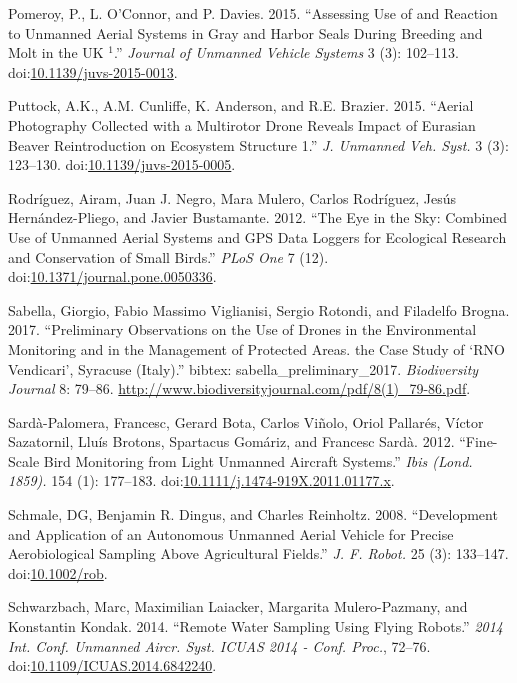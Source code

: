 \documentclass[]{interact}
\theoremstyle{plain}%
\theoremstyle{definition}
\theoremstyle{remark}
\begin{document}
\hypertarget{ref-pomeroy_assessing_2015}{}
Pomeroy, P., L. O'Connor, and P. Davies. 2015. ``Assessing Use of and
Reaction to Unmanned Aerial Systems in Gray and Harbor Seals During
Breeding and Molt in the UK \(^{\textrm{1}}\).'' \emph{Journal of
Unmanned Vehicle Systems} 3 (3): 102--113.
doi:\href{https://doi.org/10.1139/juvs-2015-0013}{10.1139/juvs-2015-0013}.

\hypertarget{ref-puttock_aerial_2015}{}
Puttock, A.K., A.M. Cunliffe, K. Anderson, and R.E. Brazier. 2015.
``Aerial Photography Collected with a Multirotor Drone Reveals Impact of
Eurasian Beaver Reintroduction on Ecosystem Structure 1.'' \emph{J.
Unmanned Veh. Syst.} 3 (3): 123--130.
doi:\href{https://doi.org/10.1139/juvs-2015-0005}{10.1139/juvs-2015-0005}.

\hypertarget{ref-rodriguez_eye_2012}{}
Rodríguez, Airam, Juan J. Negro, Mara Mulero, Carlos Rodríguez, Jesús
Hernández-Pliego, and Javier Bustamante. 2012. ``The Eye in the Sky:
Combined Use of Unmanned Aerial Systems and GPS Data Loggers for
Ecological Research and Conservation of Small Birds.'' \emph{PLoS One} 7
(12).
doi:\href{https://doi.org/10.1371/journal.pone.0050336}{10.1371/journal.pone.0050336}.

\hypertarget{ref-sabella_preliminary_2017}{}
Sabella, Giorgio, Fabio Massimo Viglianisi, Sergio Rotondi, and
Filadelfo Brogna. 2017. ``Preliminary Observations on the Use of Drones
in the Environmental Monitoring and in the Management of Protected
Areas. the Case Study of `RNO Vendicari', Syracuse (Italy).'' bibtex:
sabella\_preliminary\_2017. \emph{Biodiversity Journal} 8: 79--86.
\url{http://www.biodiversityjournal.com/pdf/8(1)_79-86.pdf}.

\hypertarget{ref-sarda-palomera_fine-scale_2012}{}
Sardà-Palomera, Francesc, Gerard Bota, Carlos Viñolo, Oriol Pallarés,
Víctor Sazatornil, Lluís Brotons, Spartacus Gomáriz, and Francesc Sardà.
2012. ``Fine-Scale Bird Monitoring from Light Unmanned Aircraft
Systems.'' \emph{Ibis (Lond. 1859).} 154 (1): 177--183.
doi:\href{https://doi.org/10.1111/j.1474-919X.2011.01177.x}{10.1111/j.1474-919X.2011.01177.x}.

\hypertarget{ref-schmale_development_2008}{}
Schmale, DG, Benjamin R. Dingus, and Charles Reinholtz. 2008.
``Development and Application of an Autonomous Unmanned Aerial Vehicle
for Precise Aerobiological Sampling Above Agricultural Fields.''
\emph{J. F. Robot.} 25 (3): 133--147.
doi:\href{https://doi.org/10.1002/rob}{10.1002/rob}.

\hypertarget{ref-schwarzbach_remote_2014}{}
Schwarzbach, Marc, Maximilian Laiacker, Margarita Mulero-Pazmany, and
Konstantin Kondak. 2014. ``Remote Water Sampling Using Flying Robots.''
\emph{2014 Int. Conf. Unmanned Aircr. Syst. ICUAS 2014 - Conf. Proc.},
72--76.
doi:\href{https://doi.org/10.1109/ICUAS.2014.6842240}{10.1109/ICUAS.2014.6842240}.
\end{document}
